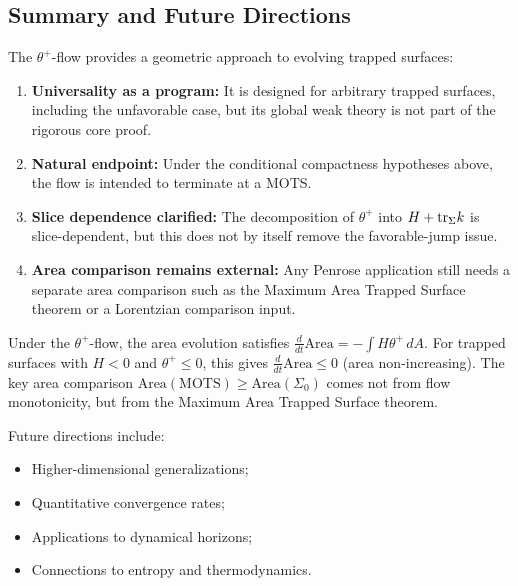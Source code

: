 \subsection{Summary and Future Directions}
\label{subsec:theta-summary}

The $\theta^+$-flow provides a geometric approach to evolving trapped surfaces:

\begin{enumerate}
\item \textbf{Universality as a program:} It is designed for arbitrary trapped surfaces, including the unfavorable case, but its global weak theory is not part of the rigorous core proof.
\item \textbf{Natural endpoint:} Under the conditional compactness hypotheses above, the flow is intended to terminate at a MOTS.
\item \textbf{Slice dependence clarified:} The decomposition of $\theta^+$ into $H+\mathrm{tr}_\Sigma k$ is slice-dependent, but this does not by itself remove the favorable-jump issue.
\item \textbf{Area comparison remains external:} Any Penrose application still needs a separate area comparison such as the Maximum Area Trapped Surface theorem or a Lorentzian comparison input.
\end{enumerate}

\begin{remark}
Under the $\theta^+$-flow, the area evolution satisfies $\frac{d}{dt}\mathrm{Area} = -\int H\theta^+ \, dA$. For trapped surfaces with $H < 0$ and $\theta^+ \leq 0$, this gives $\frac{d}{dt}\mathrm{Area} \leq 0$ (area non-increasing). The key area comparison $\mathrm{Area}(\text{MOTS}) \geq \mathrm{Area}(\Sigma_0)$ comes not from flow monotonicity, but from the Maximum Area Trapped Surface theorem.
\end{remark}

Future directions include:
\begin{itemize}
\item Higher-dimensional generalizations;
\item Quantitative convergence rates;
\item Applications to dynamical horizons;
\item Connections to entropy and thermodynamics.
\end{itemize}


